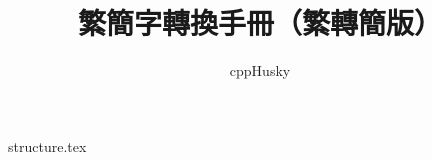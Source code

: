 \documentclass[12pt]{ctexbook}
\title{\sffamily 繁簡字轉換手冊（繁轉簡版）}
\author{cppHusky}
\date{}
\begin{document}
\maketitle
\thispagestyle{empty}
{structure.tex}
\end{document}
